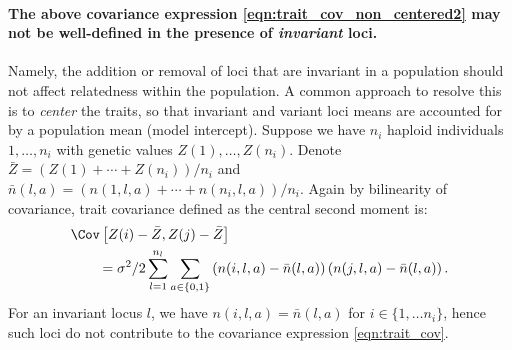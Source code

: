 
\paragraph{The above covariance expression \eqref{eqn:trait_cov_non_centered2}
may not be well-defined in the presence of \emph{invariant} loci.}
%
Namely, the addition or removal of loci that are invariant in a population
should not affect relatedness within the population.
%
A common approach to resolve this is to \emph{center} the traits, so that
invariant and variant loci means are accounted for by a population mean
(model intercept).
%
Suppose we have $n_i$ haploid individuals $1, \dots, n_i$
with genetic values $Z(1), \ldots, Z(n_i)$.
%
Denote $\bar{Z} = (Z(1) + \cdots + Z(n_i))/{n_i}$ and
$\bar{n}(l,a) = (n(1,l,a) + \cdots + n(n_i,l,a))/{n_i}$.
%
Again by bilinearity of covariance,
trait covariance defined as the central second moment is:
%
\begin{align} \label{eqn:trait_cov} %
    \begin{split}
        &\Cov\left[Z(i) - \bar{Z}, Z(j) - \bar{Z}\right] \\
        &\qquad = \sigma^2 / 2 \sum_{l=1}^{n_l} \sum_{a \in \lbrace 0, 1 \rbrace}
            \left(n(i,l,a) - \bar{n}(l,a)\right) \left(n(j,l,a) - \bar{n}(l,a)\right).
    \end{split}
\end{align}
%
For an invariant locus $l$, we have
$n(i,l,a) = \bar{n}(l,a)$ for $i \in \lbrace 1, \dots n_i \rbrace$,
hence such loci do not contribute to the covariance expression
\eqref{eqn:trait_cov}.


